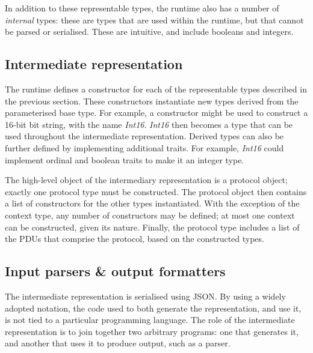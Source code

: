 \documentclass[10pt,sigconf]{acmart}
\begin{document}
In addition to these representable types, the runtime also has a number of \emph{internal}
types: these are types that are used within the runtime, but that cannot be parsed or
serialised. These are intuitive, and include booleans and integers.

\subsection{Intermediate representation}
\label{sec:gpl-ir}

The runtime defines a constructor for each of the representable types described in the
previous section. These constructors instantiate new types derived from the parameterised
base type. For example, a constructor might be used to construct a 16-bit bit string, with
the name \emph{Int16}. \emph{Int16} then becomes a type that can be used throughout the
intermediate representation. Derived types can also be further defined by implementing
additional traits. For example, \emph{Int16} could implement ordinal and boolean traits to
make it an integer type.

The high-level object of the intermediary representation is a protocol object; exactly
one protocol type must be constructed. The protocol object then contains a list of
constructors for the other types instantiated. With the exception of the context type,
any number of constructors may be defined; at most one context can be constructed, given
its nature. Finally, the protocol type includes a list of the PDUs that comprise the
protocol, based on the constructed types.

\subsection{Input parsers \& output formatters}
\label{sec:gpl-formats}

The intermediate representation is serialised using JSON. By using a widely adopted
notation, the code used to both generate the representation, and use it, is not tied to a
particular programming language. The role of the intermediate representation is to join
together two arbitrary programs: one that generates it, and another that uses it to
produce output, such as a parser.
\end{document}
